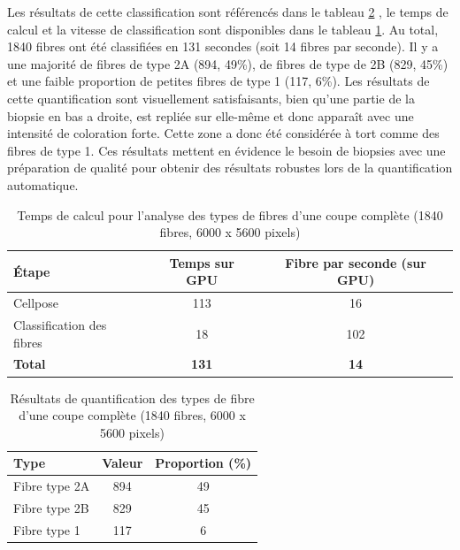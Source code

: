 Les résultats de cette classification sont référencés dans le tableau \ref{tab:atp_wsi_resultstable} , le temps de calcul et la vitesse de classification sont disponibles dans le tableau \ref{tab:atp_wsi_timetable}. Au total, 1840 fibres ont été classifiées en 131 secondes (soit 14 fibres par seconde). Il y a une majorité de fibres de type 2A (894, 49\%), de fibres de type de 2B (829, 45\%) et une faible proportion de petites fibres de type 1 (117, 6\%). Les résultats de cette quantification sont visuellement satisfaisants, bien qu'une partie de la biopsie en bas a droite, est repliée sur elle-même et donc apparaît avec une intensité de coloration forte. Cette zone a donc été considérée à tort comme des fibres de type 1. Ces résultats mettent en évidence le besoin de biopsies avec une préparation de qualité pour obtenir des résultats robustes lors de la quantification automatique.

\begin{table}[htbp]
\centering
\caption{Temps de calcul pour l'analyse des types de fibres d'une coupe complète (1840 fibres, 6000 x 5600 pixels)}
\label{tab:atp_wsi_timetable}
\begin{tabular}{|l|c|c|}
\hline
\textbf{Étape} & \textbf{Temps sur GPU} & \textbf{Fibre par seconde (sur GPU)} \\
\hline
Cellpose & 113 & 16 \\
\hline
Classification des fibres & 18 & 102 \\
\hline
\textbf{Total} & \textbf{131} & \textbf{14} \\
\hline
\end{tabular}
\end{table}
\begin{table}[htbp]
\centering
\caption{Résultats de quantification des types de fibre d'une coupe complète (1840 fibres, 6000 x 5600 pixels)}
\label{tab:atp_wsi_resultstable}
\begin{tabular}{|l|c|c|}
\hline
\textbf{Type} & \textbf{Valeur} & \textbf{Proportion (\%)} \\
\hline
Fibre type 2A & 894 & 49 \\
\hline
Fibre type 2B & 829 & 45 \\
\hline
Fibre type 1 & 117 & 6 \\
\hline
\end{tabular}
\end{table}


